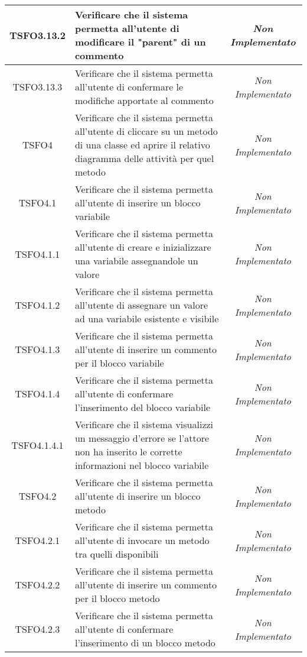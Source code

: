 \begin{longtable}{|c|>{}m{8cm}|c|}
\hypertarget{TSFO3.13.2}{TSFO3.13.2} & Verificare che il sistema permetta all'utente di modificare il "parent" di un commento & \textit{Non Implementato}\\ \hline
\hypertarget{TSFO3.13.3}{TSFO3.13.3} & Verificare che il sistema permetta all'utente di confermare le modifiche apportate al commento & \textit{Non Implementato}\\ \hline
\hypertarget{TSFO4}{TSFO4} & Verificare che il sistema permetta all'utente di cliccare su un metodo di una classe ed aprire il relativo diagramma delle attività per quel metodo & \textit{Non Implementato}\\ \hline
\hypertarget{TSFO4.1}{TSFO4.1} & Verificare che il sistema permetta all'utente di inserire un blocco variabile & \textit{Non Implementato}\\ \hline
\hypertarget{TSFO4.1.1}{TSFO4.1.1} & Verificare che il sistema permetta all'utente di creare e inizializzare una variabile assegnandole un valore & \textit{Non Implementato}\\ \hline
\hypertarget{TSFO4.1.2}{TSFO4.1.2} & Verificare che il sistema permetta all'utente di assegnare un valore ad una variabile esistente e visibile & \textit{Non Implementato}\\ \hline
\hypertarget{TSFO4.1.3}{TSFO4.1.3} & Verificare che il sistema permetta all'utente di inserire un commento per il blocco variabile & \textit{Non Implementato}\\ \hline
\hypertarget{TSFO4.1.4}{TSFO4.1.4} & Verificare che il sistema permetta all'utente di confermare l'inserimento del blocco variabile & \textit{Non Implementato}\\ \hline
\hypertarget{TSFO4.1.4.1}{TSFO4.1.4.1} & Verificare che il sistema visualizzi un messaggio d'errore se l'attore non ha inserito le corrette informazioni nel blocco variabile & \textit{Non Implementato}\\ \hline
\hypertarget{TSFO4.2}{TSFO4.2} & Verificare che il sistema permetta all'utente di inserire un blocco metodo & \textit{Non Implementato}\\ \hline
\hypertarget{TSFO4.2.1}{TSFO4.2.1} & Verificare che il sistema permetta all'utente di invocare un metodo tra quelli disponibili & \textit{Non Implementato}\\ \hline
\hypertarget{TSFO4.2.2}{TSFO4.2.2} & Verificare che il sistema permetta all'utente di inserire un commento per il blocco metodo & \textit{Non Implementato}\\ \hline
\hypertarget{TSFO4.2.3}{TSFO4.2.3} & Verificare che il sistema permetta all'utente di confermare l'inserimento di un blocco metodo & \textit{Non Implementato}\\ \hline

\end{longtable}
